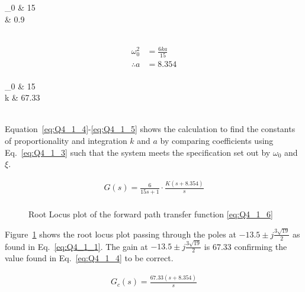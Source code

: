 \begin{conditions}
    \omega_0 & 15 \\
    \xi & 0.9 \\
\end{conditions}\\

\begin{equation}
    \begin{split}
        \omega_{0}^{2} &= \frac{6ka}{15}\\
        \therefore a &= 8.354 \\
    \end{split}\label{eq:Q4_1_5}
\end{equation}

\begin{conditions}
    \omega_0 & 15 \\
    k & 67.33 \\
\end{conditions}\\

Equation~\eqref{eq:Q4_1_4}-\eqref{eq:Q4_1_5} shows the calculation to find the constants of proportionality and integration $k$ and $a$ by comparing coefficients using Eq.~\eqref{eq:Q4_1_3} such that the system meets the specification set out by $\omega_0$ and $\xi$.

\begin{equation}
    \begin{split}
        G\left(s\right)= \frac{6}{15s+1}\cdot\frac{K\left(s+8.354\right)}{s}\\
    \end{split}\label{eq:Q4_1_6}
\end{equation}

\renewcommand{\ex}{Q4_1} 

\begin{figure}[ht!]
    \centering
    
    \caption{Root Locus plot of the forward path transfer function \eqref{eq:Q4_1_6} \appendixamble{\ex}}
    \label{fig:\ex}
\end{figure}\FloatBarrier

Figure~\ref{fig:\ex} shows the root locus plot passing through the poles at $-13.5\pm j\frac{3\sqrt{19}}{2}$ as found in Eq.~\eqref{eq:Q4_1_1}. The gain at  $-13.5\pm j\frac{3\sqrt{19}}{2}$ is 67.33 confirming the value found in Eq.~\eqref{eq:Q4_1_4} to be correct.

\begin{equation}
    \begin{split}
        G_c\left(s\right)=\frac{67.33\left(s+8.354\right)}{s}\\
    \end{split}\label{eq:Q4_1_7}
\end{equation}

